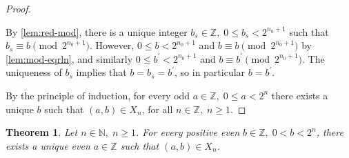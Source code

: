 \documentclass[1gpt]{article}
\theoremstyle{break}
\newtheorem{theorem}{Theorem}[section]
\begin{document}
\begin{proof}
\begin{enumerate}
            By \ref{lem:red-mod}, there is a unique integer $b_s \in
            \mathbb{Z},\; 0 \leq b_s < 2^{n_0+1}$ such that $b_s \equiv b
            \pmod{2^{n_0+1}}$. However, $0 \leq b < 2^{n_0+1}$ and $b \equiv b
            \pmod{2^{n_0+1}}$ by \ref{lem:mod-eqrln}, and similarly $0 \leq
            b^\prime < 2^{n_0+1}$ and $b \equiv b^\prime \pmod{2^{n_0+1}}$.
            The uniqueness of $b_s$ implies that $b = b_s = b^\prime$, so in
            particular $b = b^\prime$.

    \end{enumerate}

    By the principle of induction, for every odd $a \in \mathbb{Z},\; 0 \leq a
    < 2^n$ there exists a unique $b$ such that $(a, b) \in X_n$, for all $n \in
    \mathbb{Z},\; n \geq 1$. \hfill\proofSymbol

\end{proof}

\begin{theorem}
    \label{thm:even-a}
    Let $n \in \mathbb{N},\; n \geq 1$. For every positive even $b \in
    \mathbb{Z},\; 0 < b < 2^n$, there exists a unique even $a \in \mathbb{Z}$
    such that $(a, b) \in X_n$.
\end{theorem}
\end{document}
